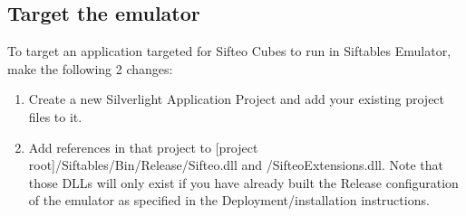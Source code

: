 \documentclass[12pt]{article}
\begin{document}
\subsection{Target the emulator}
To target an application targeted for Sifteo Cubes to run in Siftables Emulator, make the following 2 changes:
\begin{enumerate}
\item Create a new Silverlight Application Project and add your existing project files to it.
\item Add references in that project to [project root]/Siftables/Bin/Release/Sifteo.dll and /SifteoExtensions.dll. Note that those DLLs will only exist if you have already built the Release configuration of the emulator as specified in the Deployment/installation instructions.
\end{enumerate}
\end{document}
